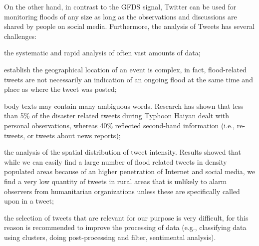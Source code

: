 \noindent On the other hand, in contrast to the GFDS signal, Twitter can be used for monitoring floods of any size as long as the observations and discussions are shared by people on social media. 
Furthermore, the analysis of Tweets has several challenges:
\begin{list}{-}{}
	\item the systematic and rapid analysis of often vast amounts of data;
	\item establish the geographical location of an event is complex, in fact, flood-related tweets are not necessarily an indication of an ongoing flood at the same time and place as where the tweet was posted;
	\item body texts may contain many ambiguous words. Research has shown that less than 5\% of the disaster related tweets during Typhoon Haiyan dealt with personal observations, whereas 40\% reflected second-hand information (i.e., re-tweets, or tweets about news reports);
	\item the analysis of the spatial distribution of tweet intensity. Results showed that while we can easily find a large number of flood related tweets in density populated areas because of an higher penetration of Internet and social media, we find a very low quantity of tweets in rural areas that is unlikely to alarm observers from humanitarian organizations unless these are specifically called upon in a tweet;
	\item the selection of tweets that are relevant for our purpose is very difficult, for this reason is recommended to improve the processing of data (e.g., classifying data using clusters, doing post-processing and filter, sentimental analysis).
\end{list}~\cite{flooddetection}